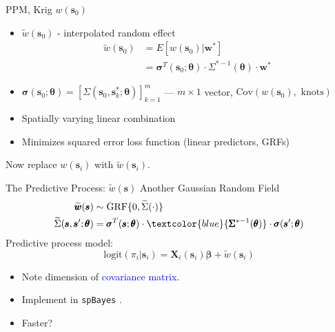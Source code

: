 \documentclass{beamer}
\begin{document}
\begin{frame}{PPM, Krig $w(\pmb{s}_{0})$} %
\begin{itemize}
\addtolength{\itemsep}{0.5\baselineskip}
\item  $\widetilde{w}(\pmb{s}_{0})$ - interpolated random effect
\begin{align*}
\widetilde{w}(\pmb{s}_{0}) &= E[w(\pmb{s}_{0})|\pmb{w}^{*}] \\
&= \pmb{\sigma}^{T}(\pmb{s}_{0};\pmb{\theta}) \cdot \Sigma^{*-1}(\pmb{\theta}) \cdot \pmb{w}^{*}
\end{align*}
\item $\pmb{\sigma}(\pmb{s}_{0};\pmb{\theta}) = \left[\Sigma(\pmb{s}_{0}, \pmb{s}_{k}^{*}; \pmb{\theta})\right]_{k = 1}^{m}$ --- $m \times 1$ vector, $\text{Cov}(w(\pmb{s}_{0}), \text{ knots})$
\item Spatially varying linear combination
\item Minimizes squared error loss function (linear predictors, GRFs)
\end{itemize}

Now replace $w(\pmb{s}_{i})$ with $\widetilde{w}(\pmb{s}_{i})$.
\end{frame}

\begin{frame}[fragile]{The Predictive Process: $\tilde{w}(\pmb{s})$}
Another Gaussian Random Field
\begin{align*}
\widetilde{\pmb{w}}(\pmb{s}) &\sim \text{GRF}\{0, \widetilde{\Sigma}(\cdot)\} \\
\widetilde{\Sigma}(\pmb{s}, \pmb{s}'; \pmb{\theta}) &= \pmb{\sigma}^{T}(\pmb{s};\pmb{\theta}) \cdot \textcolor{blue}{\pmb{\Sigma}^{*-1}(\pmb{\theta})} \cdot \pmb{\sigma}(\pmb{s}';\pmb{\theta})
\end{align*}
Predictive process model:
    \begin{equation}
    \text{logit}(\pi_{i}|\pmb{s}_{i}) = \pmb{X}_{i}(\pmb{s}_{i}) \pmb{\beta} + \widetilde{w}(\pmb{s}_{i}) \nonumber
    \end{equation}
    \begin{itemize}
    \item Note dimension of \textcolor{blue}{covariance matrix}.
    \item Implement in \verb|spBayes| \citep{Finley2013}.
    \item Faster?
    \end{itemize}
\end{frame}
\end{document}
